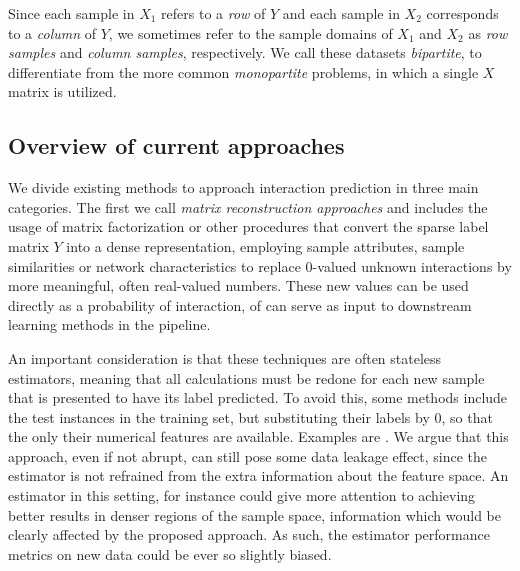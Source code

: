 \documentclass[conference]{IEEEtran}
\newcommand{\el}[1]{^{[#1]}}
\begin{document}
Since each sample in $X_1$ refers to a \emph{row} of $Y$ and each sample in
$X_2$ corresponds to a \emph{column} of $Y$, we sometimes refer to the sample
domains of $X_1$ and $X_2$ as \emph{row samples} and \emph{column samples},
respectively. We call these datasets \emph{bipartite}, to differentiate from the
more common \emph{monopartite} problems, in which a single $X$ matrix is
utilized.







\subsection{Overview of current approaches}

We divide existing methods to approach interaction prediction in three main
categories. The first we call \emph{matrix reconstruction approaches} and
includes the usage of matrix factorization or other procedures that convert the
sparse label matrix $Y$ into a dense representation, employing sample
attributes, sample similarities or network characteristics to replace 0-valued
unknown interactions by more meaningful, often real-valued numbers. These new
values can be used directly as a probability of interaction, of can serve as
input to downstream learning methods in the pipeline.

An important consideration is that these techniques are often stateless
estimators, meaning that all calculations must be redone for each new sample
that is presented to have its label predicted. To avoid this, some methods
include the test instances in the training set, but substituting their labels by
0, so that the only their numerical features are available. Examples are
\cite{}. We argue that this approach, even if not abrupt, can still pose some
data leakage effect, since the estimator is not refrained from the extra
information about the feature space. An estimator in this setting, for instance
could give more attention to achieving better results in denser regions of the
sample space, information which would be clearly affected by the proposed
approach. As such, the estimator performance metrics on new data could be ever
so slightly biased.
\end{document}
